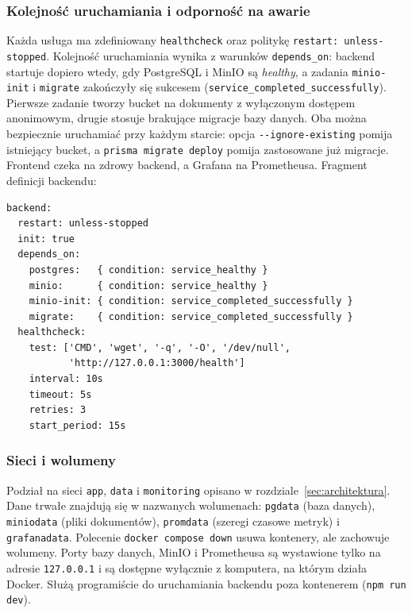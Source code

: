 \subsubsection{Kolejność uruchamiania i odporność na awarie}

Każda usługa ma zdefiniowany \texttt{healthcheck} oraz politykę
\texttt{restart: unless-stopped}. Kolejność uruchamiania wynika z warunków
\texttt{depends\_on}: backend startuje dopiero wtedy, gdy PostgreSQL i MinIO
są \emph{healthy}, a zadania \texttt{minio-init} i \texttt{migrate} zakończyły
się sukcesem (\texttt{service\_completed\_successfully}). Pierwsze zadanie
tworzy bucket na dokumenty z wyłączonym dostępem anonimowym, drugie stosuje
brakujące migracje bazy danych. Oba można bezpiecznie uruchamiać przy każdym
starcie: opcja \texttt{-{}-ignore-existing} pomija istniejący bucket, a
\texttt{prisma migrate deploy} pomija zastosowane już migracje. Frontend
czeka na zdrowy backend, a Grafana na Prometheusa. Fragment definicji
backendu:

\begin{small}
\begin{verbatim}
backend:
  restart: unless-stopped
  init: true
  depends_on:
    postgres:   { condition: service_healthy }
    minio:      { condition: service_healthy }
    minio-init: { condition: service_completed_successfully }
    migrate:    { condition: service_completed_successfully }
  healthcheck:
    test: ['CMD', 'wget', '-q', '-O', '/dev/null',
           'http://127.0.0.1:3000/health']
    interval: 10s
    timeout: 5s
    retries: 3
    start_period: 15s
\end{verbatim}
\end{small}

\subsubsection{Sieci i wolumeny}

Podział na sieci \texttt{app}, \texttt{data} i \texttt{monitoring} opisano
w rozdziale~\ref{sec:architektura}. Dane trwałe znajdują się w nazwanych
wolumenach: \texttt{pgdata} (baza danych), \texttt{miniodata} (pliki
dokumentów), \texttt{promdata} (szeregi czasowe metryk) i \texttt{grafanadata}.
Polecenie \texttt{docker compose down} usuwa kontenery, ale zachowuje
wolumeny. Porty bazy danych, MinIO i Prometheusa są wystawione tylko na adresie
\texttt{127.0.0.1} i są dostępne wyłącznie z komputera, na którym działa
Docker. Służą programiście do uruchamiania backendu poza kontenerem
(\texttt{npm run dev}).

